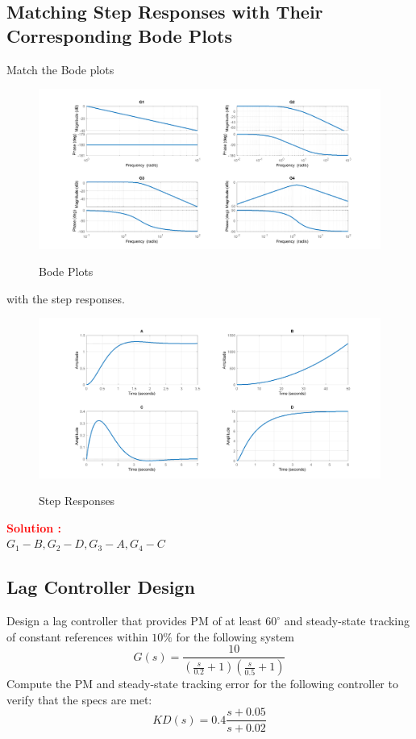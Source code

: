 \documentclass[12pt]{article}
\begin{document}
\subsection{Matching Step Responses with Their Corresponding Bode Plots}

Match the Bode plots 
\begin{figure}[H]
    \centering
    \includegraphics[width=\textwidth]{figs/6.11-1.png}
    \label{fig:99}
    \caption{Bode Plots}
\end{figure}
with the step responses.
\begin{figure}[H]
    \centering
    \includegraphics[width=\textwidth]{figs/6.11-2.png}
    \label{fig:99}
    \caption{Step Responses}
\end{figure}
\textbf{\textcolor{red}{Solution :}} \\
\(G_1-B,G_2-D,G_3-A,G_4-C\)
\clearpage

\subsection{Lag Controller Design}


Design a lag controller that provides PM of at least \(60^{\circ}\) and steady-state tracking of constant references within \(10 \%\) for the following system
\[
G(s)=\frac{10}{\left(\frac{s}{0.2}+1\right)\left(\frac{s}{0.5}+1\right)}
\]
Compute the PM and steady-state tracking error for the following controller to verify that the specs are met:
    \[
        K D(s)=0.4 \frac{s+0.05}{s+0.02}
    \]
\end{document}

